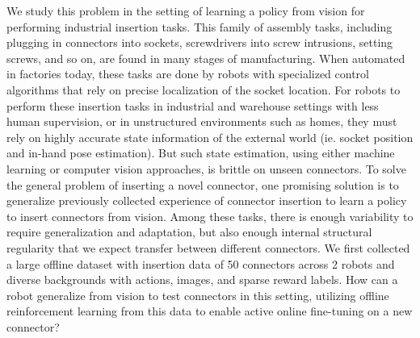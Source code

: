 \documentclass[letterpaper, 10 pt, conference, final]{ieeeconf}   %
\newcommand{\numconnectors}{50}
\begin{document}
We study this problem in the setting of learning a policy from vision for performing industrial insertion tasks.
This family of assembly tasks, including plugging in connectors into sockets, screwdrivers into screw intrusions, setting screws, and so on, are found in many stages of manufacturing.
When automated in factories today, these tasks are done by robots with specialized control algorithms that rely on precise localization of the socket location.
For robots to perform these insertion tasks in industrial and warehouse settings with less human supervision, or in unstructured environments such as homes, they must rely on highly accurate state information of the external world (ie. socket position and in-hand pose estimation).
But such state estimation, using either machine learning or computer vision approaches, is brittle on unseen connectors.
To solve the general problem of inserting a novel connector, one promising solution is to generalize previously collected experience of connector insertion to learn a policy to insert connectors from vision.
Among these tasks, there is enough variability to require generalization and adaptation, but also enough internal structural regularity that we expect transfer between different connectors.
We first collected a large offline dataset with insertion data of \numconnectors{} connectors across 2 robots and diverse backgrounds with actions, images, and sparse reward labels.
How can a robot generalize from vision to test connectors in this setting, utilizing offline reinforcement learning from this data to enable active online fine-tuning on a new connector?
\end{document}
